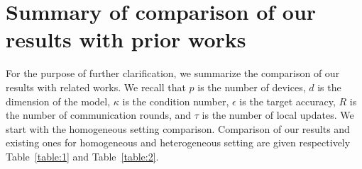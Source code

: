 \documentclass[sigconf, anonymous, review]{acmart}
\begin{document}
\section{Summary of comparison of our results with prior works}\label{app:comparison}
For the purpose of further clarification, we summarize the comparison of our results with related works. 
We recall that $p$ is the number of devices, $d$ is the dimension of the model, $\kappa$ is the condition number, $\epsilon$ is the target accuracy, $R$ is  the number of communication rounds, and $\tau$ is the number of local updates. 
We start with the homogeneous setting comparison.
Comparison of our results and existing ones for homogeneous and heterogeneous setting are given respectively Table~\ref{table:1} and Table~\ref{table:2}.


        
\end{document}
